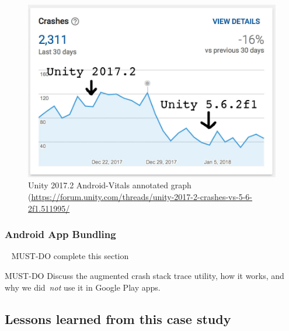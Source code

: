 \begin{figure}[htbp!]
    \centering
    \includegraphics[width=12cm]{images/unity-forum/unity-2017-2-android-vitals.jpg}
    \caption{Unity 2017.2 Android-Vitals annotated graph (\url{https://forum.unity.com/threads/unity-2017-2-crashes-vs-5-6-2f1.511995/}}
    \label{fig:unity-2017-2-android-vitals-annotated-graph}
\end{figure}


\subsubsection{Android App Bundling}~\label{kiwix-android-app-bundling-crashes}
MUST-DO complete this section

MUST-DO Discuss the augmented crash stack trace utility, how it works, and why we did~\emph{not} use it in Google Play apps.


\subsection{Lessons learned from this case study}

